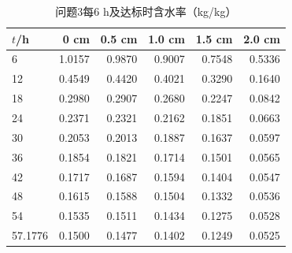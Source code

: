 \begin{table}[!htbp]\centering
\caption{问题3每6 h及达标时含水率（kg/kg）}
\begin{tabular}{lrrrrr}\toprule
$t$/h & 0 cm & 0.5 cm & 1.0 cm & 1.5 cm & 2.0 cm\\\midrule
6 & 1.0157 & 0.9870 & 0.9007 & 0.7548 & 0.5336\\
12 & 0.4549 & 0.4420 & 0.4021 & 0.3290 & 0.1640\\
18 & 0.2980 & 0.2907 & 0.2680 & 0.2247 & 0.0842\\
24 & 0.2371 & 0.2321 & 0.2162 & 0.1851 & 0.0663\\
30 & 0.2053 & 0.2013 & 0.1887 & 0.1637 & 0.0597\\
36 & 0.1854 & 0.1821 & 0.1714 & 0.1501 & 0.0565\\
42 & 0.1717 & 0.1687 & 0.1594 & 0.1404 & 0.0547\\
48 & 0.1615 & 0.1588 & 0.1504 & 0.1332 & 0.0536\\
54 & 0.1535 & 0.1511 & 0.1434 & 0.1275 & 0.0528\\
57.1776 & 0.1500 & 0.1477 & 0.1402 & 0.1249 & 0.0525\\
\bottomrule\end{tabular}\end{table}
